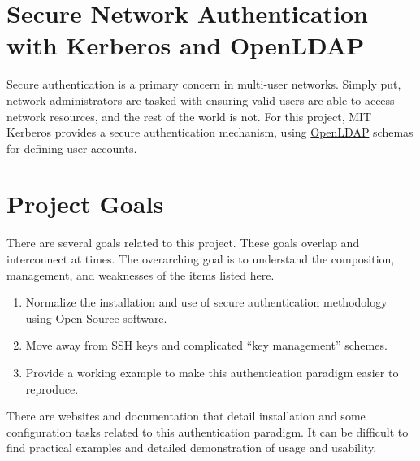 






\section{\label{sec:intro}Secure Network Authentication with Kerberos and OpenLDAP}
\vspace{2mm}

\justifying
Secure authentication is a primary concern in multi-user networks. Simply put, network administrators are tasked with ensuring 
valid users are able to access network resources, and the rest of the world is not. For this project, MIT Kerberos\cite{krb}\cite{what-is-krb} provides
a secure authentication mechanism, using \href{https://www.openldap.org/}{OpenLDAP} schemas for defining user accounts.

\section{\label{sec:Project}Project Goals}
\vspace{2mm}
\justifying
There are several goals related to this project. These goals overlap and interconnect at times. The overarching goal is to understand the composition,
management, and weaknesses of the items listed here.

\begin{raggedright}
	\begin{enumerate}
		\item Normalize the installation and use of secure authentication methodology using Open Source software.
		\item Move away from SSH keys and complicated ``key management'' schemes.
		\item Provide a working example to make this authentication paradigm easier to reproduce.
	\end{enumerate}
\end{raggedright}
\vspace{2mm}

\justifying
There are websites and documentation that detail installation and some configuration tasks related to this authentication paradigm.
It can be difficult to find practical examples and detailed demonstration of usage and usability. 

